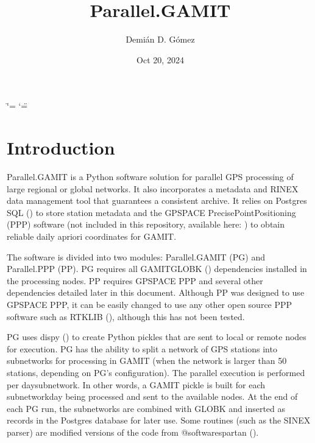 \documentclass[letterpaper,10pt,english]{sphinxmanual}
\title{Parallel.GAMIT}
\date{Oct 20, 2024}
\author{Demián D.\@{} Gómez}
\begin{document}
\ifdefined\shorthandoff
  \ifnum\catcode`\=\string=\active\shorthandoff{=}\fi
  \ifnum\catcode`\"=\active{}\fi
\fi

\pagestyle{empty}
\sphinxmaketitle
\pagestyle{plain}
\sphinxtableofcontents
\pagestyle{normal}
\label{\detokenize{index::doc}}



\chapter{Introduction}
\label{\detokenize{index:introduction}}
\sphinxAtStartPar
Parallel.GAMIT is a Python software solution for parallel GPS processing of large regional or global networks. It also incorporates a metadata and RINEX data management tool that guarantees a consistent archive. It relies on Postgres SQL () to store station metadata and the GPSPACE Precise\sphinxhyphen{}Point\sphinxhyphen{}Positioning (PPP) software (not included in this repository, available here: ) to obtain reliable daily a\sphinxhyphen{}priori coordinates for GAMIT.

\sphinxAtStartPar
The software is divided into two modules: Parallel.GAMIT (PG) and Parallel.PPP (PP). PG requires all GAMIT\sphinxhyphen{}GLOBK () dependencies installed in the processing nodes. PP requires GPSPACE PPP and several other dependencies detailed later in this document. Although PP was designed to use GPSPACE PPP, it can be easily changed to use any other open source PPP software such as RTKLIB (), although this has not been tested.

\sphinxAtStartPar
PG uses dispy () to create Python pickles that are sent to local or remote nodes for execution. PG has the ability to split a network of GPS stations into subnetworks for processing in GAMIT (when the network is larger than 50 stations, depending on PG’s configuration). The parallel execution is performed per day\sphinxhyphen{}subnetwork. In other words, a GAMIT pickle is built for each subnetwork\sphinxhyphen{}day being processed and sent to the available nodes. At the end of each PG run, the subnetworks are combined with GLOBK and inserted as records in the Postgres database for later use. Some routines (such as the SINEX parser) are modified versions of the code from @softwarespartan ().
\end{document}
